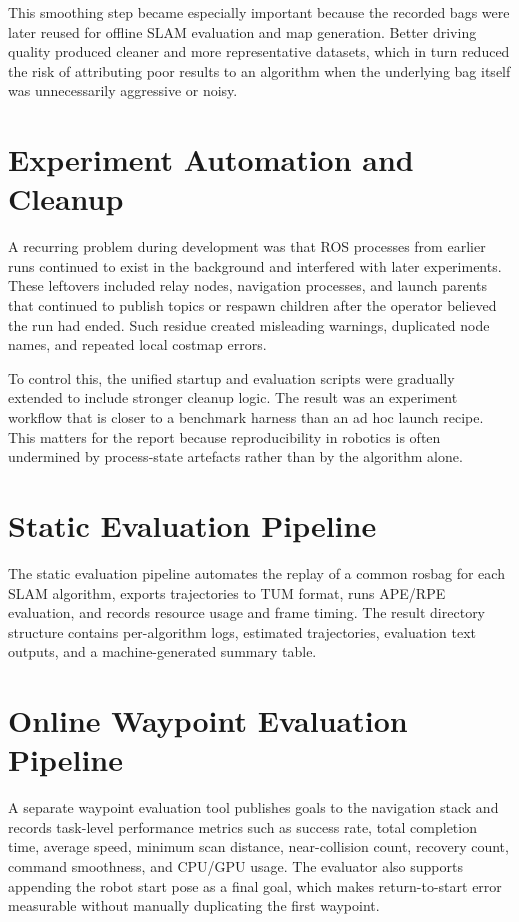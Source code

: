 \documentclass[12pt,a4paper]{report}
\begin{document}
This smoothing step became especially important because the recorded bags were later reused for offline SLAM evaluation and map generation. Better driving quality produced cleaner and more representative datasets, which in turn reduced the risk of attributing poor results to an algorithm when the underlying bag itself was unnecessarily aggressive or noisy.

\section{Experiment Automation and Cleanup}
A recurring problem during development was that ROS processes from earlier runs continued to exist in the background and interfered with later experiments. These leftovers included relay nodes, navigation processes, and launch parents that continued to publish topics or respawn children after the operator believed the run had ended. Such residue created misleading warnings, duplicated node names, and repeated local costmap errors.

To control this, the unified startup and evaluation scripts were gradually extended to include stronger cleanup logic. The result was an experiment workflow that is closer to a benchmark harness than an ad hoc launch recipe. This matters for the report because reproducibility in robotics is often undermined by process-state artefacts rather than by the algorithm alone.

\section{Static Evaluation Pipeline}
The static evaluation pipeline automates the replay of a common rosbag for each SLAM algorithm, exports trajectories to TUM format, runs APE/RPE evaluation, and records resource usage and frame timing. The result directory structure contains per-algorithm logs, estimated trajectories, evaluation text outputs, and a machine-generated summary table.

\section{Online Waypoint Evaluation Pipeline}
A separate waypoint evaluation tool publishes goals to the navigation stack and records task-level performance metrics such as success rate, total completion time, average speed, minimum scan distance, near-collision count, recovery count, command smoothness, and CPU/GPU usage. The evaluator also supports appending the robot start pose as a final goal, which makes return-to-start error measurable without manually duplicating the first waypoint.
\end{document}
